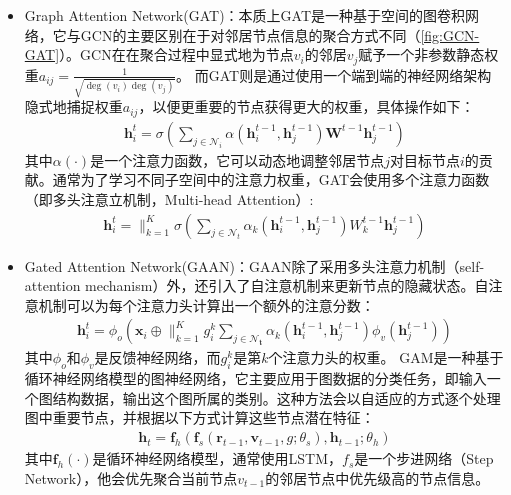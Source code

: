 \begin{itemize}
    \item Graph Attention Network(GAT)\cite{velivckovic2017graph}：本质上GAT是一种基于空间的图卷积网络，它与GCN的主要区别在于对邻居节点信息的聚合方式不同（\autoref{fig:GCN-GAT}）。GCN在在聚合过程中显式地为节点$v_i$的邻居$v_j$赋予一个非参数静态权重$a_{ij}=\frac{1}{\sqrt{\operatorname{deg}\left(v_{i}\right) \operatorname{deg}\left(v_{j}\right)}}$。
    而GAT则是通过使用一个端到端的神经网络架构隐式地捕捉权重$a_{ij}$，以便更重要的节点获得更大的权重，具体操作如下：
    \begin{align}
        \mathbf{h}_{i}^{t}=\sigma\left(\sum_{j \in \mathcal{N}_{i}} \alpha\left(\mathbf{h}_{i}^{t-1}, \mathbf{h}_{j}^{t-1}\right) \mathbf{W}^{t-1} \mathbf{h}_{j}^{t-1}\right)
    \end{align}
    其中$\alpha(\cdot)$是一个注意力函数，它可以动态地调整邻居节点$j$对目标节点$i$的贡献。通常为了学习不同子空间中的注意力权重，GAT会使用多个注意力函数（即多头注意立机制，Multi-head Attention）:
    \begin{align}
        \mathbf{h}_{i}^{t}=\|_{k=1}^{K} \sigma\left(\sum_{j \in \mathcal{N}_{t}} \alpha_{k}\left(\mathbf{h}_{i}^{t-1}, \mathbf{h}_{j}^{t-1}\right) W_{k}^{t-1} \mathbf{h}_{j}^{t-1}\right)
    \end{align}

    \item Gated Attention Network(GAAN)\cite{lee2017deep}\cite{zhang2018gaan}：GAAN除了采用多头注意力机制（self-attention mechanism）外，还引入了自注意机制来更新节点的隐藏状态。自注意机制可以为每个注意力头计算出一个额外的注意分数：
    \begin{align}
        \mathbf{h}_{i}^{t}=\phi_{o}\left(\mathbf{x}_{i} \oplus \|_{k=1}^{K} g_{i}^{k} \sum_{j \in \mathcal{N}_{\mathbf{t}}} \alpha_{k}\left(\mathbf{h}_{i}^{t-1}, \mathbf{h}_{j}^{t-1}\right) \phi_{v}\left(\mathbf{h}_{j}^{t-1}\right)\right)
    \end{align}
    其中$\phi_{o}\text{和}\phi_{v}$是反馈神经网络，而$g_{i}^{k}$是第$k$个注意力头的权重。
    GAM是一种基于循环神经网络模型的图神经网络，它主要应用于图数据的分类任务，即输入一个图结构数据，输出这个图所属的类别。这种方法会以自适应的方式逐个处理图中重要节点，并根据以下方式计算这些节点潜在特征：
    \begin{align}
        \mathbf{h}_{t}=\mathbf{f}_{h}\left(\mathbf{f}_{s}\left(\mathbf{r}_{t-1}, \mathbf{v}_{t-1}, g ; \theta_{s}\right), \mathbf{h}_{t-1} ; \theta_{h}\right)
    \end{align}
    其中$\mathbf{f}_{h}(\cdot)$是循环神经网络模型，通常使用LSTM，$f_s$是一个步进网络（Step Network），他会优先聚合当前节点$v_{t-1}$的邻居节点中优先级高的节点信息。
\end{itemize}
